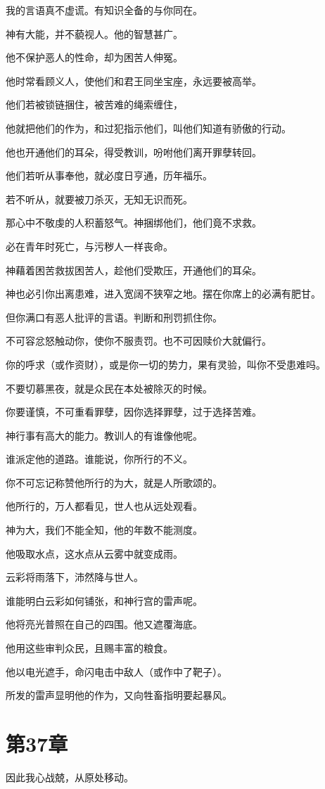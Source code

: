 \documentclass[12pt,oneside]{book}
\begin{document}
我的言语真不虚谎。有知识全备的与你同在。

神有大能，并不藐视人。他的智慧甚广。

他不保护恶人的性命，却为困苦人伸冤。

他时常看顾义人，使他们和君王同坐宝座，永远要被高举。

他们若被锁链捆住，被苦难的绳索缠住，

他就把他们的作为，和过犯指示他们，叫他们知道有骄傲的行动。

他也开通他们的耳朵，得受教训，吩咐他们离开罪孽转回。

他们若听从事奉他，就必度日亨通，历年福乐。

若不听从，就要被刀杀灭，无知无识而死。

那心中不敬虔的人积蓄怒气。神捆绑他们，他们竟不求救。

必在青年时死亡，与污秽人一样丧命。

神藉着困苦救拔困苦人，趁他们受欺压，开通他们的耳朵。

神也必引你出离患难，进入宽阔不狭窄之地。摆在你席上的必满有肥甘。

但你满口有恶人批评的言语。判断和刑罚抓住你。

不可容忿怒触动你，使你不服责罚。也不可因赎价大就偏行。

你的呼求（或作资财），或是你一切的势力，果有灵验，叫你不受患难吗。

不要切慕黑夜，就是众民在本处被除灭的时候。

你要谨慎，不可重看罪孽，因你选择罪孽，过于选择苦难。

神行事有高大的能力。教训人的有谁像他呢。

谁派定他的道路。谁能说，你所行的不义。

你不可忘记称赞他所行的为大，就是人所歌颂的。

他所行的，万人都看见，世人也从远处观看。

神为大，我们不能全知，他的年数不能测度。

他吸取水点，这水点从云雾中就变成雨。

云彩将雨落下，沛然降与世人。

谁能明白云彩如何铺张，和神行宫的雷声呢。

他将亮光普照在自己的四围。他又遮覆海底。

他用这些审判众民，且赐丰富的粮食。

他以电光遮手，命闪电击中敌人（或作中了靶子）。

所发的雷声显明他的作为，又向牲畜指明要起暴风。


\chapter{第37章}
因此我心战兢，从原处移动。
\end{document}
